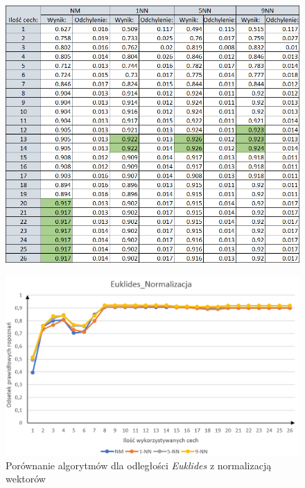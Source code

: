 \documentclass[12pt]{article}
\begin{document}
\begin{figure}[H]
	\centering
	\label{algorytmy_manhatan_norm_tab}
		\includegraphics[scale=0.8]{images/algorithms/manhatan_norm_tab.png}
	
\end{figure}

\begin{figure}[H]
	\centering
		\includegraphics[scale=0.66]{images/algorithms/euklides_norm.png}
	\caption{Porównanie algorytmów dla odległości \textit{Euklides} z normalizacją wektorów}
	\label{algorytmy_euklides_norm_wyk}
\end{figure}
\end{document}
